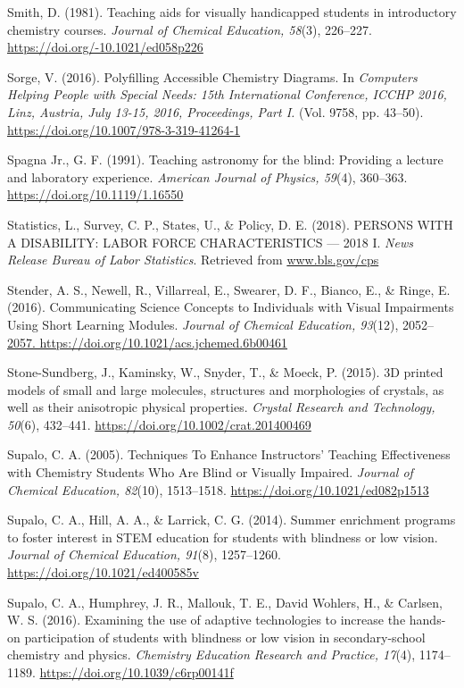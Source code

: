 \documentclass[11.5pt]{sig-alternate} %
\begin{document}
Smith, D. (1981). Teaching aids for visually handicapped students in introductory chemistry courses. \textit{Journal of Chemical Education, 58}(3), 226–227. \url{https://doi.org/-10.1021/ed058p226}

Sorge, V. (2016). Polyfilling Accessible Chemistry Diagrams. In \textit{Computers Helping People with Special Needs: 15th International Conference, ICCHP 2016, Linz, Austria, July 13-15, 2016, Proceedings, Part I.} (Vol. 9758, pp. 43–50). \url{https://doi.org/10.1007/978-3-319-41264-1}

Spagna Jr., G. F. (1991). Teaching astronomy for the blind: Providing a lecture and laboratory experience. \textit{American Journal of Physics, 59}(4), 360–363. \url{https://doi.org/10.1119/1.16550}

Statistics, L., Survey, C. P., States, U., \& Policy, D. E. (2018). PERSONS WITH A DISABILITY: LABOR FORCE CHARACTERISTICS — 2018 I. \textit{News Release Bureau of Labor Statistics}. Retrieved from \url{www.bls.gov/cps}

Stender, A. S., Newell, R., Villarreal, E., Swearer, D. F., Bianco, E., \& Ringe, E. (2016). Communicating Science Concepts to Individuals with Visual Impairments Using Short Learning Modules. \textit{Journal of Chemical Education, 93}(12), 2052–\url{2057. https://doi.org/10.1021/acs.jchemed.6b00461}

Stone-Sundberg, J., Kaminsky, W., Snyder, T., \& Moeck, P. (2015). 3D printed models of small and large molecules, structures and morphologies of crystals, as well as their anisotropic physical properties. \textit{Crystal Research and Technology, 50}(6), 432–441. \url{https://doi.org/10.1002/crat.201400469}

Supalo, C. A. (2005). Techniques To Enhance Instructors’ Teaching Effectiveness with Chemistry Students Who Are Blind or Visually Impaired. \textit{Journal of Chemical Education, 82}(10), 1513–1518. \url{https://doi.org/10.1021/ed082p1513}

Supalo, C. A., Hill, A. A., \& Larrick, C. G. (2014). Summer enrichment programs to foster interest in STEM education for students with blindness or low vision. \textit{Journal of Chemical Education, 91}(8), 1257–1260. \url{https://doi.org/10.1021/ed400585v}

Supalo, C. A., Humphrey, J. R., Mallouk, T. E., David Wohlers, H., \& Carlsen, W. S. (2016). Examining the use of adaptive technologies to increase the hands-on participation of students with blindness or low vision in secondary-school chemistry and physics. \textit{Chemistry Education Research and Practice, 17}(4), 1174–1189. \url{https://doi.org/10.1039/c6rp00141f}
\end{document}
